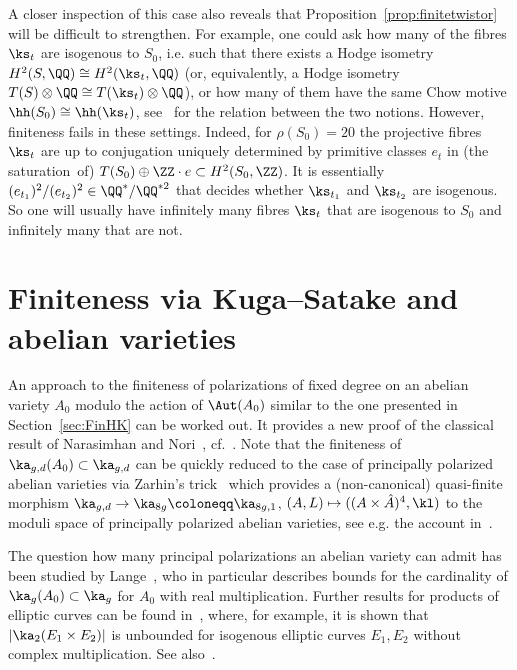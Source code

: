 A closer inspection of this case also reveals that Proposition~\ref{prop:finitetwistor} will be difficult to strengthen. For example, one could ask how many of the fibres $\ks_t$ are isogenous to $S_0$, i.e. such that there exists a Hodge isometry $H^2(S,\QQ)\cong H^2(\ks_t,\QQ)$ (or, equivalently, a Hodge isometry $T(S)\otimes\QQ\cong T(\ks_t)\otimes\QQ$), or how many of them have the same Chow motive $\hh(S_0)\cong \hh(\ks_t)$, see~\cite{HuyMot} for the relation between the two notions. However, finiteness fails in these settings. Indeed, for $\rho(S_0)=20$ the projective fibres $\ks_t$ are up to conjugation uniquely determined by primitive classes $e_t$ in (the saturation~of) $T(S_0)\oplus\ZZ\cdot e\subset H^2(S_0,\ZZ)$. It is essentially $(e_{t_1})^2/(e_{t_2})^2\in\QQ^\ast/\QQ^{\ast2}$ that decides whether $\ks_{t_1}$ and $\ks_{t_2}$ are isogenous. So one will usually have infinitely many fibres $\ks_t$ that are isogenous to $S_0$ and infinitely many that are not.


\section{Finiteness via Kuga--Satake and abelian varieties}\label{sec:KS}

An approach to the finiteness of polarizations of fixed degree on an abelian variety $A_0$ modulo the action of $\Aut(A_0)$ similar to the one presented in Section~\ref{sec:FinHK} can be worked out. It provides a new proof of the classical result of Narasimhan and Nori~\cite{NarNor}, cf.~\cite[Section~18]{Milne}. Note that the finiteness of $\ka_{g,d}(A_0)\subset \ka_{g,d}$ can be quickly reduced to the case of principally polarized abelian varieties via Zarhin's trick~\cite{Zarhin} which provides a (non-canonical) quasi-finite morphism $\ka_{g,d}\to\ka_{8g}\coloneqq\ka_{8g,1}$, $(A,L)\mapsto ((A\times \hat A)^4,\kl)$ to the moduli space of principally polarized abelian varieties, see e.g. the account in~\cite[Section~4.1]{OS}.

The question how many principal polarizations an abelian variety can admit has been studied by Lange~\cite{La}, who in particular describes bounds for the cardinality of $\ka_g(A_0)\subset \ka_g$ for $A_0$ with real multiplication. Further results for products of elliptic curves can be found in~\cite{Hay,La2}, where, for example, it is shown that $|\ka_2(E_1\times E_2)|$ is unbounded for isogenous elliptic curves $E_1,E_2$ without complex multiplication. See also~\cite{Howe1,Howe2}.


